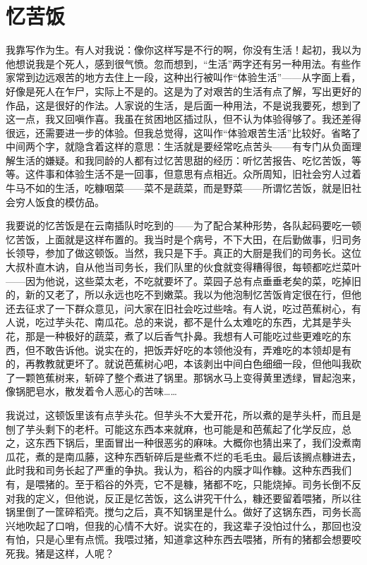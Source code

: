 \chapter{忆苦饭}

我靠写作为生。有人对我说：像你这样写是不行的啊，你没有生活！起初，我以为他想说我是个死人，感到很气愤。忽而想到，“生活”两字还有另一种用法。有些作家常到边远艰苦的地方去住上一段，这种出行被叫作“体验生活”——从字面上看，好像是死人在乍尸，实际上不是的。这是为了对艰苦的生活有点了解，写出更好的作品，这是很好的作法。人家说的生活，是后面一种用法，不是说我要死，想到了这一点，我又回嗔作喜。我虽在贫困地区插过队，但不认为体验得够了。我还差得很远，还需要进一步的体验。但我总觉得，这叫作“体验艰苦生活”比较好。省略了中间两个字，就隐含着这样的意思：生活就是要经常吃点苦头——有专门从负面理解生活的嫌疑。和我同龄的人都有过忆苦思甜的经历：听忆苦报告、吃忆苦饭，等等。这件事和体验生活不是一回事，但意思有点相近。众所周知，旧社会穷人过着牛马不如的生活，吃糠咽菜——菜不是蔬菜，而是野菜——所谓忆苦饭，就是旧社会穷人饭食的模仿品。 

我要说的忆苦饭是在云南插队时吃到的——为了配合某种形势，各队起码要吃一顿忆苦饭，上面就是这样布置的。我当时是个病号，不下大田，在后勤做事，归司务长领导，参加了做这顿饭。当然，我只是下手。真正的大厨是我们的司务长。这位大叔朴直木讷，自从他当司务长，我们队里的伙食就变得糟得很，每顿都吃烂菜叶——因为他说，这些菜太老，不吃就要坏了。菜园子总有点垂垂老矣的菜，吃掉旧的，新的又老了，所以永远也吃不到嫩菜。我以为他泡制忆苦饭肯定很在行，但他还去征求了一下群众意见，问大家在旧社会吃过些啥。有人说，吃过芭蕉树心，有人说，吃过芋头花、南瓜花。总的来说，都不是什么太难吃的东西，尤其是芋头花，那是一种极好的蔬菜，煮了以后香气扑鼻。我想有人可能吃过些更难吃的东西，但不敢告诉他。说实在的，把饭弄好吃的本领他没有，弄难吃的本领却是有的，再教教就更坏了。就说芭蕉树心吧，本该剥出中间白色细细一段，但他叫我砍了一颗笆蕉树来，斩碎了整个煮进了锅里。那锅水马上变得黄里透绿，冒起泡来，像锅肥皂水，散发着令人恶心的苦味…… 

我说过，这顿饭里该有点芋头花。但芋头不大爱开花，所以煮的是芋头杆，而且是刨了芋头剩下的老杆。可能这东西本来就麻，也可能是和芭蕉起了化学反应，总之，这东西下锅后，里面冒出一种很恶劣的麻味。大概你也猜出来了，我们没煮南瓜花，煮的是南瓜藤，这种东西斩碎后是些煮不烂的毛毛虫。最后该搁点糠进去，此时我和司务长起了严重的争执。我认为，稻谷的内膜才叫作糠。这种东西我们有，是喂猪的。至于稻谷的外壳，它不是糠，猪都不吃，只能烧掉。司务长倒不反对我的定义，但他说，反正是忆苦饭，这么讲究干什么，糠还要留着喂猪，所以往锅里倒了一筐碎稻壳。搅匀之后，真不知锅里是什么。做好了这锅东西，司务长高兴地吹起了口哨，但我的心情不大好。说实在的，我这辈子没怕过什么，那回也没有怕，只是心里有点慌。我喂过猪，知道拿这种东西去喂猪，所有的猪都会想要咬死我。猪是这样，人呢？ 

